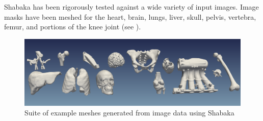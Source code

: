 Shabaka has been rigorously tested against a wide variety of input images. Image masks have been meshed for the heart, brain, lungs, liver, skull, pelvis, vertebra, femur, and portions of the knee joint (see ).

\begin{figure}
\centering
\vspace{2.5mm}
\includegraphics[width=1.0\textwidth]{media/2-shabaka/2-surf/6-showcase.png}
\caption{Suite of example meshes generated from image data using Shabaka}
\label{fig:showcase}
\end{figure}
